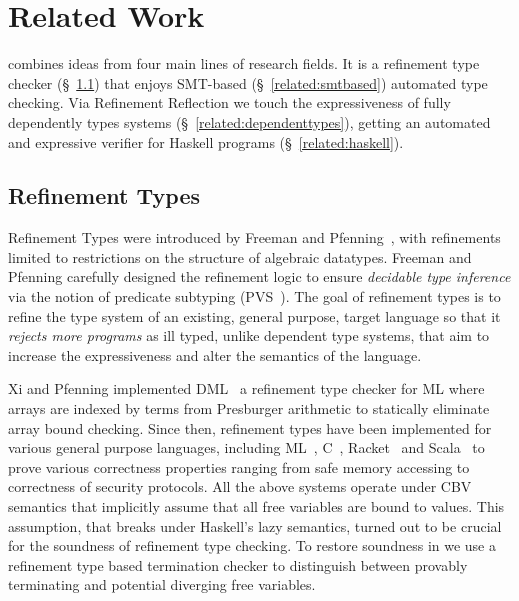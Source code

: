 \chapter{Related Work}\label{chapter:related}

\toolname combines ideas from four main lines of research fields. 
%
It is a 
refinement type checker (\S~\ref{related:refinementtypes})
that enjoys SMT-based (\S~\ref{related:smtbased}) automated type checking. 
Via Refinement Reflection we touch the expressiveness 
of fully dependently types systems (\S~\ref{related:dependenttypes}), 
getting an automated and expressive verifier for Haskell programs (\S~\ref{related:haskell}).  
%


\section{Refinement Types}\label{related:refinementtypes}


Refinement Types were introduced by Freeman and
Pfenning~\cite{FreemanPfenning91}, with refinements limited to
restrictions on the structure of algebraic datatypes. 
%
Freeman and Pfenning carefully designed the refinement logic 
to ensure \textit{decidable type inference}
via the notion of predicate subtyping (PVS~\cite{Rushby98}).
% 
The goal of refinement types is 
to refine the type system of an existing, general purpose,  
target language so that it
\textit{rejects more programs} as ill typed, 
unlike dependent type systems, 
that aim to increase the expressiveness 
and alter the semantics of the language.

Xi and Pfenning implemented DML~\cite{pfenningxi98}
a refinement type checker for ML 
where arrays are indexed by terms 
from Presburger arithmetic to statically eliminate array bound checking. 
%
Since then, refinement types have been implemented for various general purpose languages, 
including 
ML~\cite{GordonTOPLAS2011,LiquidPLDI08},
C~\cite{deputy,LiquidPOPL10},
Racket~\cite{RefinedRacket}
and Scala~\cite{refinedscala}
to prove various correctness properties ranging from safe memory accessing 
to correctness of security protocols.
%
All the above systems operate under CBV semantics 
that implicitly assume that all free variables are bound to values. 
%
This assumption, that breaks under Haskell's lazy semantics,
turned out to be crucial for the soundness 
of refinement type checking.
To restore soundness in \toolname we 
use a refinement type based termination checker 
to distinguish between provably terminating and potential diverging free variables. 


